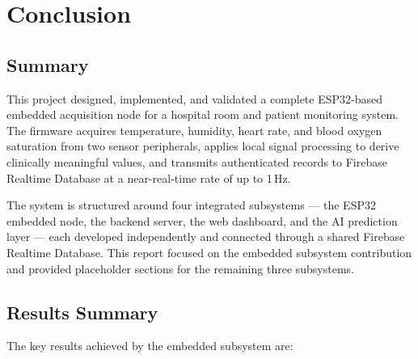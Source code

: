 
\chapter{Conclusion}
\label{ch:conclusion}

\section{Summary}

This project designed, implemented, and validated a complete ESP32-based embedded
acquisition node for a hospital room and patient monitoring system.
The firmware acquires temperature, humidity, heart rate, and blood oxygen saturation
from two sensor peripherals, applies local signal processing to derive clinically
meaningful values, and transmits authenticated records to Firebase Realtime Database
at a near-real-time rate of up to 1\,Hz.

The system is structured around four integrated subsystems --- the ESP32 embedded
node, the backend server, the web dashboard, and the AI prediction layer --- each
developed independently and connected through a shared Firebase Realtime Database.
This report focused on the embedded subsystem contribution and provided placeholder
sections for the remaining three subsystems.

\section{Results Summary}

The key results achieved by the embedded subsystem are:

